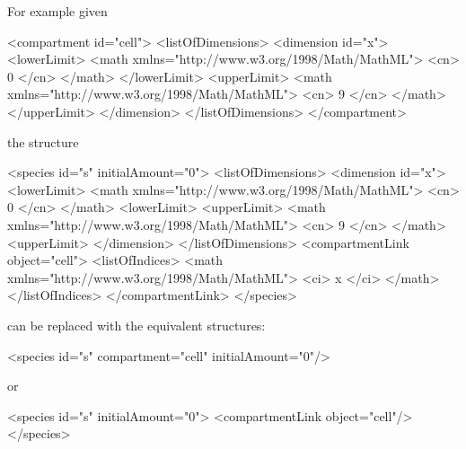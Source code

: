 \documentclass{cekarticle}
\begin{document}
For example given
\begin{example}
<compartment id="cell">
    <listOfDimensions>
         <dimension id="x">
             <lowerLimit>
                 <math xmlns="http://www.w3.org/1998/Math/MathML">
                     <cn> 0 </cn>
                 </math>
             </lowerLimit>
             <upperLimit>
                 <math xmlns="http://www.w3.org/1998/Math/MathML">
                     <cn> 9 </cn>
                 </math>
             </upperLimit>
         </dimension>
    </listOfDimensions>
</compartment>
\end{example}
the structure
\begin{example}
<species id="s" initialAmount="0">
    <listOfDimensions>
        <dimension id="x">
            <lowerLimit>
                <math xmlns="http://www.w3.org/1998/Math/MathML">
                    <cn> 0 </cn>
                </math>
            <lowerLimit>
            <upperLimit>
                <math xmlns="http://www.w3.org/1998/Math/MathML">
                    <cn> 9 </cn>
                </math>
            <upperLimit>
        </dimension>
    </listOfDimensions>
    <compartmentLink object="cell">
        <listOfIndices>
            <math xmlns="http://www.w3.org/1998/Math/MathML">
                <ci> x </ci>
            </math>
        </listOfIndices>
    </compartmentLink>
</species>
\end{example}
can be replaced with the equivalent structures:
\begin{example}
<species id="s" compartment="cell" initialAmount="0"/>
\end{example}
or
\begin{example}
<species id="s" initialAmount="0">
    <compartmentLink object="cell"/>
</species>
\end{example}
\end{document}
